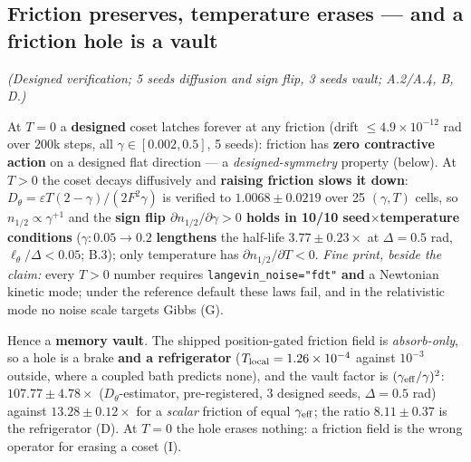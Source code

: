 \documentclass{article}
\begin{document}
\subsection{Friction preserves, temperature erases --- and a friction hole is a vault}

\emph{(Designed verification; 5 seeds diffusion and sign flip, 3 seeds vault; A.2/A.4, B, D.)}

At $T=0$ a \textbf{designed} coset latches forever at any friction (drift $\le4.9\times10^{-12}$ rad over $200$k steps, all $\gamma\in[0.002,0.5]$, 5 seeds): friction has \textbf{zero contractive action} on a designed flat direction --- a \emph{designed-symmetry} property (below). At $T>0$ the coset decays diffusively and \textbf{raising friction slows it down}: $D_\theta=\varepsilon T(2-\gamma)/(2F^2\gamma)$ is verified to $1.0068\pm0.0219$ over 25 $(\gamma,T)$ cells, so $n_{1/2}\propto\gamma^{+1}$ and the \textbf{sign flip $\partial n_{1/2}/\partial\gamma>0$ holds in 10/10 seed$\times$temperature conditions} ($\gamma:0.05\to0.2$ \textbf{lengthens} the half-life $3.77\pm0.23\times$ at $\Delta=0.5$ rad, $\ell_\theta/\Delta<0.05$; B.3); only temperature has $\partial n_{1/2}/\partial T<0$. \emph{Fine print, beside the claim:} every $T>0$ number requires \texttt{langevin\_noise="fdt"} \textbf{and} a Newtonian kinetic mode; under the reference default these laws fail, and in the relativistic mode no noise scale targets Gibbs (G).

Hence a \textbf{memory vault}. The shipped position-gated friction field is \emph{absorb-only}, so a hole is a brake \textbf{and a refrigerator} ($T_{\rm local}=1.26\times10^{-4}$ against $10^{-3}$ outside, where a coupled bath predicts none), and the vault factor is $(\gamma_{\rm eff}/\gamma)^2$: \textbf{$107.77\pm4.78\times$} ($D_\theta$-estimator, pre-registered, 3 designed seeds, $\Delta=0.5$ rad) against $13.28\pm0.12\times$ for a \emph{scalar} friction of equal $\gamma_{\rm eff}$; the ratio $8.11\pm0.37$ is the refrigerator (D). At $T=0$ the hole erases nothing: a friction field is the wrong operator for erasing a coset (I).
\end{document}
